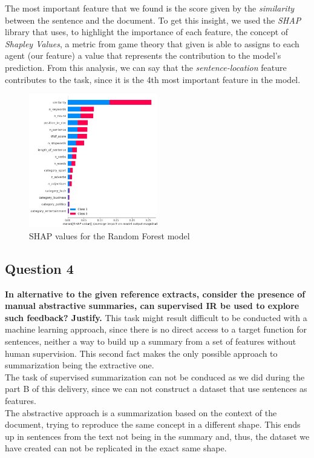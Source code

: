 The most important feature that we found is the score given by the \textit{similarity} between the sentence and the document. To get this 
insight, we used the \textit{SHAP} library that uses, to highlight the importance of each feature, the concept of 
\textit{Shapley Values}, a metric from game theory that given is able to assigns to each agent (our feature) a value that represents the contribution to the model's prediction.
From this analysis, we can say that the \textit{sentence-location} feature contributes to the task, since it is the 4th most important feature in the model.

\begin{figure}[H]
  \centering
  \includegraphics[width=0.5\textwidth]{images/shap.png}
  \caption{SHAP values for the Random Forest model}
  \label{fig:shap_values}
\end{figure}

\subsection{Question 4}
\textbf{In alternative to the given reference extracts, consider the presence of manual abstractive summaries, can supervised IR be used to explore such feedback? Justify.}
This task might result difficult to be conducted with a machine learning approach, since there is no direct access to a target function for sentences, neither a way to build up a summary from a set of features without human supervision. This second fact makes the only possible approach to summarization being the extractive one. \\
The task of supervised summarization can not be conduced as we did during the part B of this delivery, since we can not construct a dataset that use sentences as features.\\
The abstractive approach is a summarization based on the context of the document, trying to reproduce the same concept in a different shape. This ends up in sentences from the text not being in the summary and, thus, the dataset we have created can not be replicated in the exact same shape. 

